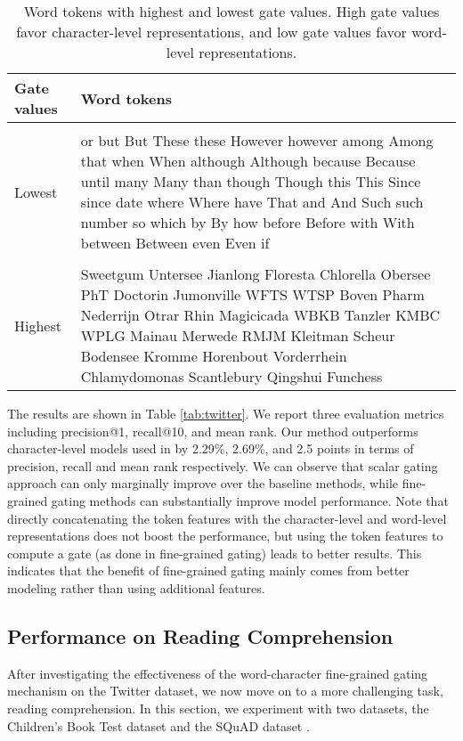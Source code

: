 \documentclass{article} \usepackage{iclr2017_conference,times}
\begin{document}
\begin{table}[t]
\caption{\small Word tokens with highest and lowest gate values. High gate values favor character-level representations, and low gate values favor word-level representations.}
\label{tab:top}
\begin{center}
\begin{tabular}{lp{11.5cm}}
Gate values & Word tokens
\\ \hline \\
Lowest & or but But These these However however among Among that when When although Although because Because until many Many than though Though this This Since since date where Where have That and And Such such number so which by By how before Before with With between Between even Even if \\ \hline \\
Highest & Sweetgum Untersee Jianlong Floresta Chlorella Obersee PhT Doctorin Jumonville WFTS WTSP Boven Pharm Nederrijn Otrar Rhin Magicicada WBKB Tanzler KMBC WPLG Mainau Merwede RMJM Kleitman Scheur Bodensee Kromme Horenbout Vorderrhein Chlamydomonas Scantlebury Qingshui Funchess 
\end{tabular}
\end{center}
\end{table}

The results are shown in Table \ref{tab:twitter}. We report three evaluation metrics including precision@1, recall@10, and mean rank. Our method outperforms character-level models used in \cite{dhingra2016tweet2vec} by 2.29\%, 2.69\%, and 2.5 points in terms of precision, recall and mean rank respectively. We can observe that scalar gating approach \citep{miyamoto2016gated} can only marginally improve over the baseline methods, while fine-grained gating methods can substantially improve model performance. Note that directly concatenating the token features with the character-level and word-level representations does not boost the performance, but using the token features to compute a gate (as done in fine-grained gating) leads to better results. This indicates that the benefit of fine-grained gating mainly comes from better modeling rather than using additional features.


\subsection{Performance on Reading Comprehension}

After investigating the effectiveness of the word-character fine-grained gating mechanism on the Twitter dataset, we now move on to a more challenging task, reading comprehension. In this section, we experiment with two datasets, the Children's Book Test dataset \citep{hill2015goldilocks} and the SQuAD dataset \citep{pranav2016squad}.
\end{document}
